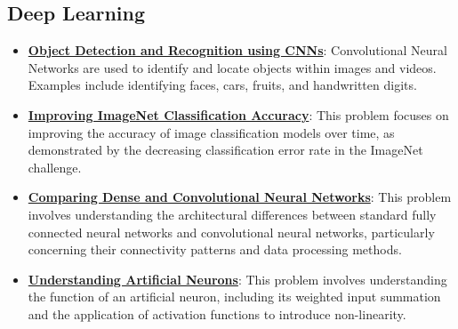 \documentclass{article}%
\begin{document}
%
\subsection{Deep Learning}%
\label{subsec:DeepLearning}%
\begin{itemize}[leftmargin=*]%
\item \href{https://purdue.brightspace.com/d2l/common/assets/pdfjs-d2l-dist/1.0.14-legacy/web/viewer.html?file=\%2Fcontent\%2Fenforced\%2F1095467-wl.202510.CS.24300.001\%2F09L1-cnn.pdf\%3Fou\%3D1095467\&lang=en-us\&container=d2l-fileviewer-rendered-pdf\&fullscreen=d2l-fileviewer-rendered-pdf-dialog\&height=667#page=2}{\textbf{Object Detection and Recognition using CNNs}}: Convolutional Neural Networks are used to identify and locate objects within images and videos. Examples include identifying faces, cars, fruits, and handwritten digits.%
\item \href{https://purdue.brightspace.com/d2l/common/assets/pdfjs-d2l-dist/1.0.14-legacy/web/viewer.html?file=\%2Fcontent\%2Fenforced\%2F1095467-wl.202510.CS.24300.001\%2F09L1-cnn.pdf\%3Fou\%3D1095467\&lang=en-us\&container=d2l-fileviewer-rendered-pdf\&fullscreen=d2l-fileviewer-rendered-pdf-dialog\&height=667#page=3}{\textbf{Improving ImageNet Classification Accuracy}}: This problem focuses on improving the accuracy of image classification models over time, as demonstrated by the decreasing classification error rate in the ImageNet challenge.%
\item \href{https://purdue.brightspace.com/d2l/common/assets/pdfjs-d2l-dist/1.0.14-legacy/web/viewer.html?file=\%2Fcontent\%2Fenforced\%2F1095467-wl.202510.CS.24300.001\%2F09L1-cnn.pdf\%3Fou\%3D1095467\&lang=en-us\&container=d2l-fileviewer-rendered-pdf\&fullscreen=d2l-fileviewer-rendered-pdf-dialog\&height=667#page=4}{\textbf{Comparing Dense and Convolutional Neural Networks}}: This problem involves understanding the architectural differences between standard fully connected neural networks and convolutional neural networks, particularly concerning their connectivity patterns and data processing methods.%
\item \href{https://purdue.brightspace.com/d2l/common/assets/pdfjs-d2l-dist/1.0.14-legacy/web/viewer.html?file=\%2Fcontent\%2Fenforced\%2F1095467-wl.202510.CS.24300.001\%2F09L1-cnn.pdf\%3Fou\%3D1095467\&lang=en-us\&container=d2l-fileviewer-rendered-pdf\&fullscreen=d2l-fileviewer-rendered-pdf-dialog\&height=667#page=5}{\textbf{Understanding Artificial Neurons}}: This problem involves understanding the function of an artificial neuron, including its weighted input summation and the application of activation functions to introduce non-linearity.%

\end{itemize}
\end{document}
